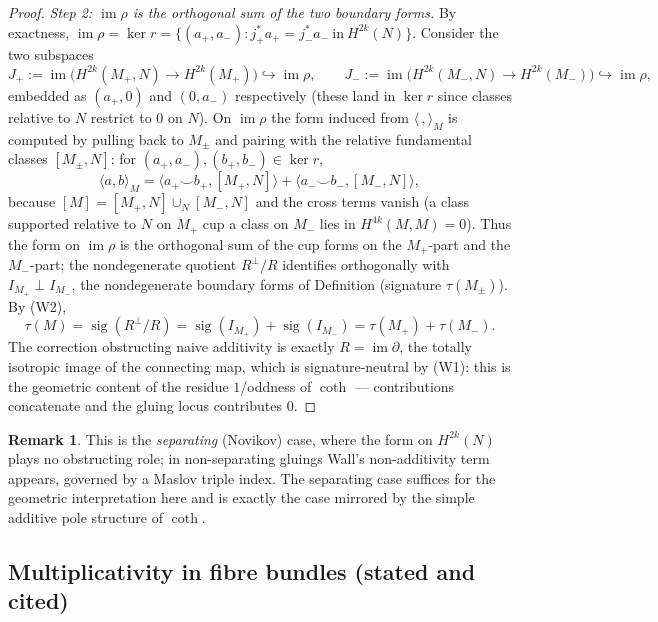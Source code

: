 \documentclass[12pt]{article}
\theoremstyle{definition}
\newtheorem{remark}{Remark}
\begin{document}
\begin{proof}
\emph{Step 2: $\operatorname{im}\rho$ is the orthogonal sum of the two boundary forms.}
By exactness, $\operatorname{im}\rho=\ker r=\{(a_+,a_-):j_+^\ast a_+=j_-^\ast a_-\ \text{in}\ H^{2k}(N)\}$.
Consider the two subspaces
\[
J_+:=\operatorname{im}\big(H^{2k}(M_+,N)\to H^{2k}(M_+)\big)\hookrightarrow\operatorname{im}\rho,
\qquad
J_-:=\operatorname{im}\big(H^{2k}(M_-,N)\to H^{2k}(M_-)\big)\hookrightarrow\operatorname{im}\rho,
\]
embedded as $(a_+,0)$ and $(0,a_-)$ respectively (these land in $\ker r$ since classes
relative to $N$ restrict to $0$ on $N$). On $\operatorname{im}\rho$ the form induced from
$\langle\,,\rangle_M$ is computed by pulling back to $M_\pm$ and pairing with the relative
fundamental classes $[M_\pm,N]$: for $(a_+,a_-),(b_+,b_-)\in\ker r$,
\[
\langle a,b\rangle_M=\langle a_+\smile b_+,[M_+,N]\rangle+\langle a_-\smile b_-,[M_-,N]\rangle,
\]
because $[M]=[M_+,N]\cup_N[M_-,N]$ and the cross terms vanish (a class supported relative
to $N$ on $M_+$ cup a class on $M_-$ lies in $H^{4k}(M,M)=0$). Thus the form on
$\operatorname{im}\rho$ is the orthogonal sum of the cup forms on the $M_+$-part and the
$M_-$-part; the nondegenerate quotient $R^\perp/R$ identifies orthogonally with
$I_{M_+}\perp I_{M_-}$, the nondegenerate boundary forms of Definition (signature
$\tau(M_\pm)$). By (W2),
\[
\tau(M)=\operatorname{sig}(R^\perp/R)=\operatorname{sig}(I_{M_+})+\operatorname{sig}(I_{M_-})
=\tau(M_+)+\tau(M_-).
\]
The correction obstructing naive additivity is exactly $R=\operatorname{im}\partial$, the
totally isotropic image of the connecting map, which is signature-neutral by (W1): this is
the geometric content of the residue $1$/oddness of $\coth$ --- contributions concatenate
and the gluing locus contributes $0$.
\end{proof}

\begin{remark}
This is the \emph{separating} (Novikov) case, where the form on $H^{2k}(N)$ plays no
obstructing role; in non-separating gluings Wall's non-additivity term appears, governed by
a Maslov triple index. The separating case suffices for the geometric interpretation here
and is exactly the case mirrored by the simple additive pole structure of $\coth$.
\end{remark}

\subsection*{Multiplicativity in fibre bundles (stated and cited)}
\end{document}

